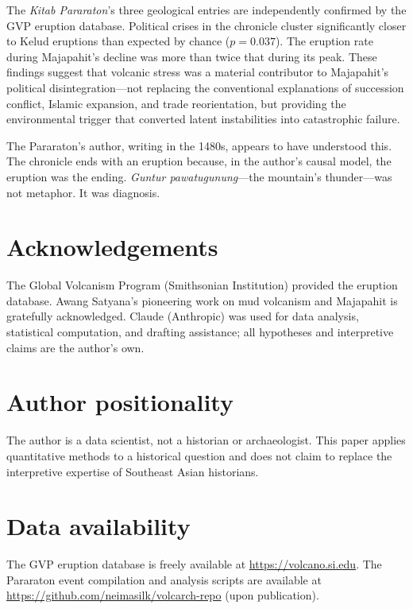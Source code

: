 \documentclass[12pt,a4paper]{article}
\begin{document}
The \textit{Kitab Pararaton}'s three geological entries are independently confirmed by the GVP eruption database.
Political crises in the chronicle cluster significantly closer to Kelud eruptions than expected by chance ($p = 0.037$).
The eruption rate during Majapahit's decline was more than twice that during its peak.
These findings suggest that volcanic stress was a material contributor to Majapahit's political disintegration---not replacing the conventional explanations of succession conflict, Islamic expansion, and trade reorientation, but providing the environmental trigger that converted latent instabilities into catastrophic failure.

The Pararaton's author, writing in the 1480s, appears to have understood this.
The chronicle ends with an eruption because, in the author's causal model, the eruption was the ending.
\textit{Guntur pawatugunung}---the mountain's thunder---was not metaphor.
It was diagnosis.

\section*{Acknowledgements}

The Global Volcanism Program (Smithsonian Institution) provided the eruption database.
Awang Satyana's pioneering work on mud volcanism and Majapahit is gratefully acknowledged.
Claude (Anthropic) was used for data analysis, statistical computation, and drafting assistance; all hypotheses and interpretive claims are the author's own.

\section*{Author positionality}

The author is a data scientist, not a historian or archaeologist.
This paper applies quantitative methods to a historical question and does not claim to replace the interpretive expertise of Southeast Asian historians.

\section*{Data availability}

The GVP eruption database is freely available at \url{https://volcano.si.edu}.
The Pararaton event compilation and analysis scripts are available at \url{https://github.com/neimasilk/volcarch-repo} (upon publication).


\end{document}
